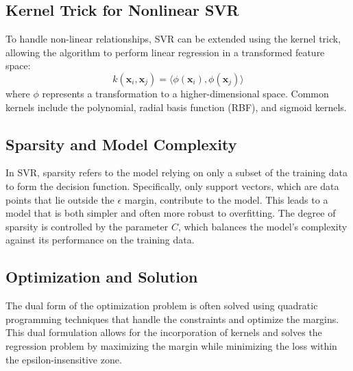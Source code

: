 \documentclass[12pt]{article}
\begin{document}
\subsection{Kernel Trick for Nonlinear SVR}
To handle non-linear relationships, SVR can be extended using the kernel trick, allowing the algorithm to perform linear regression in a transformed feature space:
\begin{equation}
k(\mathbf{x}_i, \mathbf{x}_j) = \langle \phi(\mathbf{x}_i), \phi(\mathbf{x}_j) \rangle
\end{equation}
where $\phi$ represents a transformation to a higher-dimensional space. Common kernels include the polynomial, radial basis function (RBF), and sigmoid kernels.

\subsection{Sparsity and Model Complexity}
In SVR, sparsity refers to the model relying on only a subset of the training data to form the decision function. Specifically, only support vectors, which are data points that lie outside the $\epsilon$ margin, contribute to the model. This leads to a model that is both simpler and often more robust to overfitting. The degree of sparsity is controlled by the parameter $C$, which balances the model's complexity against its performance on the training data.


\subsection{Optimization and Solution}
The dual form of the optimization problem is often solved using quadratic programming techniques that handle the constraints and optimize the margins. This dual formulation allows for the incorporation of kernels and solves the regression problem by maximizing the margin while minimizing the loss within the epsilon-insensitive zone.
\end{document}
